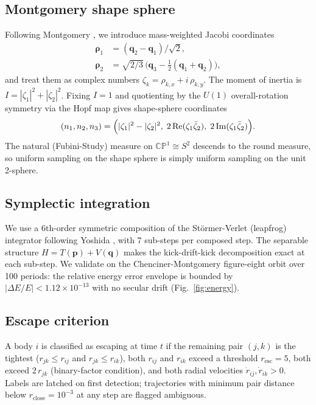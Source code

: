 \documentclass[twocolumn,prl]{revtex4-2}
\begin{document}
\subsection{Montgomery shape sphere}

Following Montgomery \cite{Montgomery1998}, we introduce mass-weighted
Jacobi coordinates
\begin{align}
\boldsymbol{\rho}_1 &= (\mathbf{q}_2 - \mathbf{q}_1)/\sqrt{2}, \\
\boldsymbol{\rho}_2 &= \sqrt{2/3}\,
  \bigl(\mathbf{q}_3 - \tfrac{1}{2}(\mathbf{q}_1 + \mathbf{q}_2)\bigr),
\end{align}
and treat them as complex numbers $\zeta_k = \rho_{k,x} + i\,\rho_{k,y}$.
The moment of inertia is $I = |\zeta_1|^2 + |\zeta_2|^2$.
Fixing $I = 1$ and quotienting by the $U(1)$ overall-rotation symmetry
via the Hopf map gives shape-sphere coordinates
\begin{equation}
(n_1, n_2, n_3) = \Bigl(
  |\zeta_1|^2 - |\zeta_2|^2,\;
  2\,\mathrm{Re}(\zeta_1\bar\zeta_2),\;
  2\,\mathrm{Im}(\zeta_1\bar\zeta_2)
\Bigr).
\label{eq:hopf}
\end{equation}
The natural (Fubini-Study) measure on $\mathbb{CP}^1 \cong S^2$ descends
to the round measure, so uniform sampling on the shape sphere is simply
uniform sampling on the unit 2-sphere.

\subsection{Symplectic integration}

We use a 6th-order symmetric composition of the St\"ormer-Verlet
(leapfrog) integrator following Yoshida \cite{Yoshida1990}, with 7
sub-steps per composed step. The separable structure $H = T(\mathbf{p})
+ V(\mathbf{q})$ makes the kick-drift-kick decomposition exact at each
sub-step. We validate on the Chenciner-Montgomery figure-eight orbit
\cite{Chenciner2000} over 100 periods: the relative energy error
envelope is bounded by $|\Delta E / E| < 1.12 \times 10^{-13}$ with no
secular drift (Fig.~\ref{fig:energy}).

\subsection{Escape criterion}

A body $i$ is classified as escaping at time $t$ if the remaining pair
$(j,k)$ is the tightest ($r_{jk} \le r_{ij}$ and $r_{jk} \le r_{ik}$),
both $r_{ij}$ and $r_{ik}$ exceed a threshold $r_{\mathrm{esc}} = 5$,
both exceed $2\,r_{jk}$ (binary-factor condition), and both radial
velocities $\dot{r}_{ij}, \dot{r}_{ik} > 0$. Labels are latched on
first detection; trajectories with minimum pair distance below
$r_{\mathrm{close}} = 10^{-3}$ at any step are flagged ambiguous.
\end{document}
